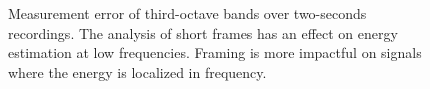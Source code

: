 \documentclass[final,3p,times,twocolumn]{elsarticle}
\begin{document}
\begin{figure}[h!]
    \caption{Measurement error of third-octave bands over two-seconds recordings. The analysis of short frames has an effect on energy estimation at low frequencies. Framing is more impactful on signals where the energy is localized in frequency. \label{fig:errorm}}
\end{figure}


\end{document}
